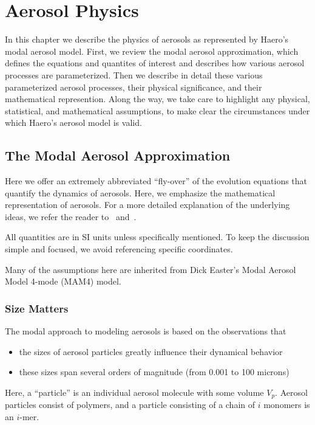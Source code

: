 \chapter{Aerosol Physics}

In this chapter we describe the physics of aerosols as represented by Haero's
modal aerosol model. First, we review the modal aerosol approximation, which
defines the equations and quantites of interest and describes how various
aerosol processes are parameterized. Then we describe in detail these various
parameterized aerosol processes, their physical significance, and their
mathematical represention. Along the way, we take care to highlight any
physical, statistical, and mathematical assumptions, to make clear the
circumstances under which Haero's aerosol model is valid.

\section{The Modal Aerosol Approximation}

Here we offer an extremely abbreviated ``fly-over'' of the evolution equations
that quantify the dynamics of aerosols. Here, we emphasize the mathematical
representation of aerosols. For a more detailed explanation of the underlying
ideas, we refer the reader to~\cite{Whitby1991} and~\cite{Friedlander1977}.

All quantities are in SI units unless specifically mentioned. To keep the
discussion simple and focused, we avoid referencing specific coordinates.

Many of the assumptions here are inherited from Dick Easter's Modal Aerosol
Model 4-mode (MAM4) model.

\subsection*{Size Matters}

The modal approach to modeling aerosols is based on the observations that

\begin{itemize}
  \item the sizes of aerosol particles greatly influence their dynamical
        behavior
  \item these sizes span several orders of magnitude (from 0.001 to 100 microns)
\end{itemize}

Here, a ``particle'' is an individual aerosol molecule with some volume $V_p$.
Aerosol particles consist of polymers, and a particle consisting of a chain of
$i$ monomers is an $i$-mer.

